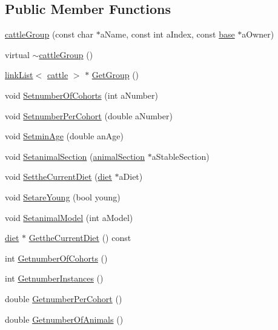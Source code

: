 \subsection*{Public Member Functions}
\begin{DoxyCompactItemize}
\item 
\hyperlink{classcattle_group_a102bb5873e737914585e0e224df5af39}{cattleGroup} (const char $\ast$aName, const int aIndex, const \hyperlink{classbase}{base} $\ast$aOwner)
\item 
virtual \hyperlink{classcattle_group_a219cd352f81d78c80e2db2db42115759}{$\sim$cattleGroup} ()
\item 
\hyperlink{classlink_list}{linkList}$<$ \hyperlink{classcattle}{cattle} $>$ $\ast$ \hyperlink{classcattle_group_a47b11b9e0be1fb80820d8f86977ec707}{GetGroup} ()
\item 
void \hyperlink{classcattle_group_a14ec1ee0cbb551779d345f32ef826fe9}{SetnumberOfCohorts} (int aNumber)
\item 
void \hyperlink{classcattle_group_a1a4190031a49739e70822028a0579260}{SetnumberPerCohort} (double aNumber)
\item 
void \hyperlink{classcattle_group_ad530749d37d2e4c8af575699c79adb65}{SetminAge} (double anAge)
\item 
void \hyperlink{classcattle_group_aae729884313654275cbc05971e104637}{SetanimalSection} (\hyperlink{classanimal_section}{animalSection} $\ast$aStableSection)
\item 
void \hyperlink{classcattle_group_a43dfb891301a9a4c1452f2c8937c206f}{SettheCurrentDiet} (\hyperlink{classdiet}{diet} $\ast$aDiet)
\item 
void \hyperlink{classcattle_group_a8a49f4292ec8181467cdc9a1155d6782}{SetareYoung} (bool young)
\item 
void \hyperlink{classcattle_group_a17c74ae8a19301ebad46f82c82d4e188}{SetanimalModel} (int aModel)
\item 
\hyperlink{classdiet}{diet} $\ast$ \hyperlink{classcattle_group_a002c57c86825dcb46870c50ce97f9d79}{GettheCurrentDiet} () const 
\item 
int \hyperlink{classcattle_group_abd59eca5138e783ad615b0944915e072}{GetnumberOfCohorts} ()
\item 
int \hyperlink{classcattle_group_ac3b718d495e6af88eb4b9e26ec3bf795}{GetnumberInstances} ()
\item 
double \hyperlink{classcattle_group_a8c1f3939bebff589498dde95743927a6}{GetnumberPerCohort} ()
\item 
double \hyperlink{classcattle_group_aeb189fcd248d7444d6e23a3f5c36a8ef}{GetnumberOfAnimals} ()

\end{DoxyCompactItemize}
